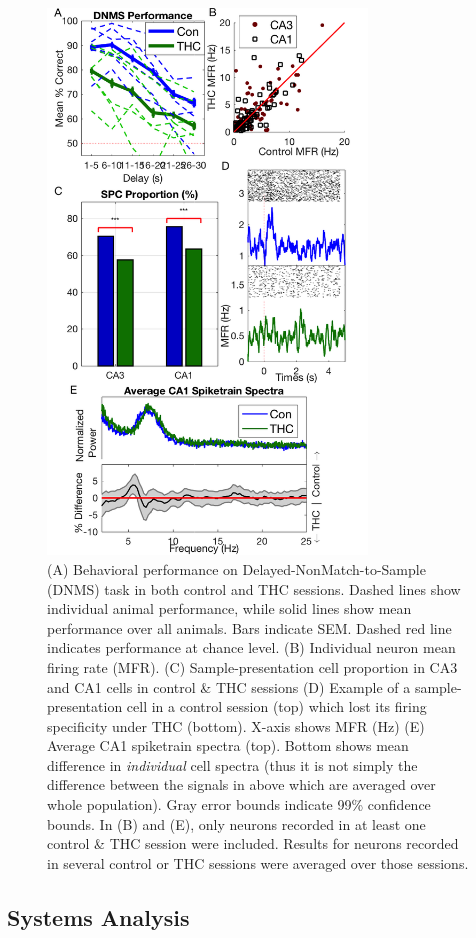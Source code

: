 \documentclass[11pt,a4paper,final]{article}
\begin{document}
\begin{figure}[!ht]
\centering
\includegraphics[width=85mm]{sig}
\caption[Signal Analysis]{
(A) Behavioral performance on Delayed-NonMatch-to-Sample (DNMS) task in both control and THC sessions. Dashed lines show individual animal performance, while solid lines show mean performance over all animals. Bars indicate SEM. Dashed red line indicates performance at chance level.
(B) Individual neuron mean firing rate (MFR).
(C) Sample-presentation cell proportion in CA3 and CA1 cells in control \& THC sessions
(D) Example of a sample-presentation cell in a control session (top) which lost its firing specificity under THC (bottom). X-axis shows MFR (Hz)
(E) Average CA1 spiketrain spectra (top). Bottom shows mean difference in \textit{individual} cell spectra (thus it is not simply the difference between the signals in above which are averaged over whole population). Gray error bounds indicate 99\% confidence bounds.
In (B) and (E), only neurons recorded in at least one control \& THC session were included. Results for neurons recorded in several control or THC sessions were averaged over those sessions.}
\label{sig}
\end{figure}


    \subsection{Systems Analysis}
\end{document}
